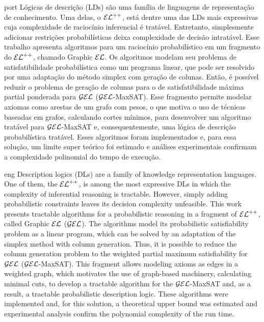 
\begin{resumo}{port}
  Lógicas de descrição (LDs) são uma família de linguagens de representação de conhecimento. Uma delas, o $\mathcal{EL}^{++}$, está dentre uma das LDs mais expressivas cuja complexidade de raciocínio inferencial é tratável. Entretanto, simplesmente adicionar restrições probabilísticas deixa complexidade de decisão intratável. Esse trabalho apresenta algoritmos para um raciocínio probabilístico em um fragmento do $\mathcal{EL}^{++}$, chamado Graphic $\mathcal{EL}$. Os algoritmos modelam seu problema de satisfatibilidade probabilística como um programa linear, que pode ser resolvido por uma adaptação do método simplex com geração de colunas. Então, é possível reduzir o problema de geração de colunas para o de satisfatibilidade máxima partial ponderada para $\mathcal{GEL}$ ($\mathcal{GEL}$-MaxSAT). Esse fragmento permite modelar axiomas como arestas de um grafo com pesos, o que motiva o uso de técnicas baseadas em grafos, calculando cortes mínimos, para desenvolver um algoritmo tratável para $\mathcal{GEL}$-MaxSAT e, consequentemente, uma lógica de descrição probabilística tratável. Esses algoritmos foram implementados e, para essa solução, um limite super teórico foi estimado e análises experimentais confirmam a complexidade polinomial do tempo de execução.  
\end{resumo}

\begin{resumo}{eng}
  Description logics (DLs) are a family of knowledge representation languages. One of them, the $\mathcal{EL}^{++}$, is among the most expressive DLs in which the complexity of inferential reasoning is tractable. However, simply adding probabilistic constraints leaves its decision complexity unfeasible. This work presents tractable algorithms for a probabilistic reasoning in a fragment of $\mathcal{EL}^{++}$, called Graphic $\mathcal{EL}$ ($\mathcal{GEL}$). The algorithms model its probabilistic satisfiability problem as a linear program, which can be solved by an adaptation of the simplex method with column generation. Thus, it is possible to reduce the column generation problem to the weighted partial maximum satisfiability for $\mathcal{GEL}$ ($\mathcal{GEL}$-MaxSAT). This fragment allows modeling axioms as edges in a weighted graph, which motivates the use of graph-based machinery, calculating minimal cuts, to develop a tractable algorithm for the $\mathcal{GEL}$-MaxSAT and, as a result, a tractable probabilistic description logic. These algorithms were implemented and, for this solution, a theoretical upper bound was estimated and experimental analysis confirm the polynomial complexity of the run time. 
\end{resumo}

